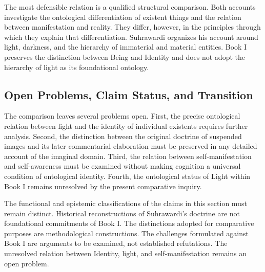 \label{para:VS.B01.P01.C08.S14.SS19.P004}

The most defensible relation is a qualified
structural comparison.
Both accounts investigate
the ontological differentiation
of existent things and
the relation between
manifestation and reality.
They differ, however,
in the principles through
which they explain that
differentiation. Suhrawardi
organizes his account
around light, darkness,
and the hierarchy of
immaterial and material
entities. Book I preserves
the distinction between
Being and Identity and
does not adopt the
hierarchy of light as
its foundational ontology.


\subsection{Open Problems, Claim Status, and Transition}
\label{sec:ch08-s14-ss20}

\label{para:VS.B01.P01.C08.S14.SS20.P001}

The comparison leaves several problems open.
First, the precise ontological relation
between light and the identity of
individual existents requires further
analysis. Second, the distinction
between the original doctrine of
suspended images and its later
commentarial elaboration must be
preserved in any detailed account
of the imaginal domain. Third,
the relation between self-manifestation
and self-awareness must be examined
without making cognition a universal
condition of ontological identity.
Fourth, the ontological status of
Light within Book I remains
unresolved by the present
comparative inquiry.

\label{para:VS.B01.P01.C08.S14.SS20.P002}

The functional and epistemic classifications
of the claims in this section
must remain distinct. Historical
reconstructions of Suhrawardi's
doctrine are not foundational
commitments of Book I.
The distinctions adopted
for comparative purposes
are methodological constructions.
The challenges formulated
against Book I are arguments
to be examined, not
established refutations.
The unresolved relation
between Identity, light,
and self-manifestation
remains an open problem.

